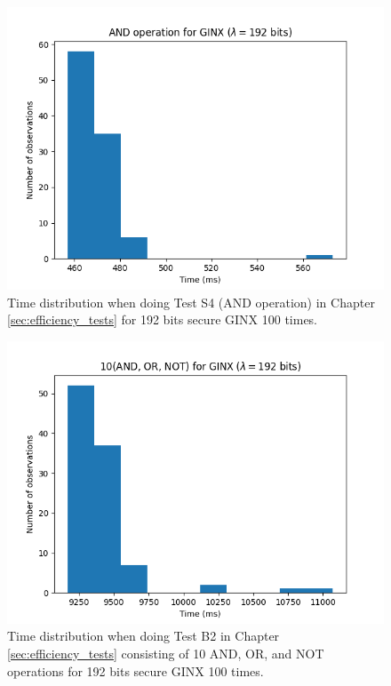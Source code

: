 \begin{figure}[ht]
    \centering
    \includegraphics[width=0.8\linewidth]{data/figures/GINX_STD192_AND_operation.png}
    \caption{Time distribution when doing Test S4 (AND operation) in Chapter \ref{sec:efficiency_tests} for 192 bits secure GINX 100 times.}
    \label{fig:distr_ginx192_and}
\end{figure}

\begin{figure}[ht]
    \centering
    \includegraphics[width=0.8\linewidth]{data/figures/GINX_STD192_10AND_OR_NOT.png}
    \caption{Time distribution when doing Test B2 in Chapter \ref{sec:efficiency_tests} consisting of 10 AND, OR, and NOT operations for 192 bits secure GINX 100 times.}
    \label{fig:distr_ginx192_10}
\end{figure}

